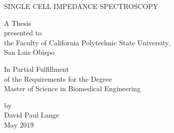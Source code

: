 \begin{titlepage}
\begin{center}
\vspace*{1cm}

\large SINGLE CELL IMPEDANCE SPECTROSCOPY

\vfill

A Thesis\\
presented to\\
the Faculty of California Polytechnic State University,\\
San Luis Obispo\\

\vfill

In Partial Fulfillment\\
of the Requirements for the Degree\\
Master of Science in Biomedical Engineering\\

\vspace{0.75 in}

by\\
David Paul Lange\\
May 2019
\vspace{1.5 in}
    
    
\end{center}
\end{titlepage}